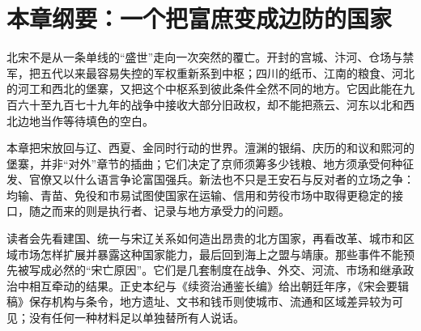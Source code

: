 \section{本章纲要：一个把富庶变成边防的国家}

北宋不是从一条单线的“盛世”走向一次突然的覆亡。开封的宫城、汴河、仓场与禁军，把五代以来最容易失控的军权重新系到中枢；四川的纸币、江南的粮食、河北的河工和西北的堡寨，又把这个中枢系到彼此条件全然不同的地方。它因此能在九百六十至九百七十九年的战争中接收大部分旧政权，却不能把燕云、河东以北和西北边地当作等待填色的空白。

本章把宋放回与辽、西夏、金同时行动的世界。澶渊的银绢、庆历的和议和熙河的堡寨，并非“对外”章节的插曲；它们决定了京师须筹多少钱粮、地方须承受何种征发、官僚又以什么语言争论富国强兵。新法也不只是王安石与反对者的立场之争：均输、青苗、免役和市易试图使国家在运输、信用和劳役市场中取得更稳定的接口，随之而来的则是执行者、记录与地方承受力的问题。

读者会先看建国、统一与宋辽关系如何造出昂贵的北方国家，再看改革、城市和区域市场怎样扩展并暴露这种国家能力，最后回到海上之盟与靖康。那些事件不能预先被写成必然的“宋亡原因”。它们是几套制度在战争、外交、河流、市场和继承政治中相互牵动的结果。正史本纪与《续资治通鉴长编》给出朝廷年序，《宋会要辑稿》保存机构与条令，地方遗址、文书和钱币则使城市、流通和区域差异较为可见；没有任何一种材料足以单独替所有人说话。
